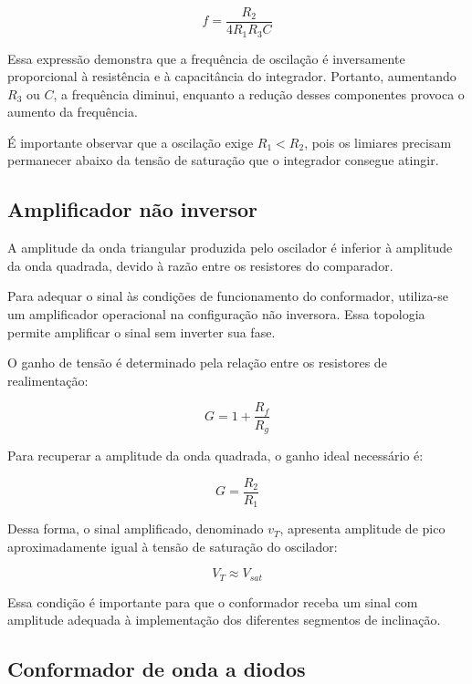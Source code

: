 \documentclass[11pt,a4paper]{article}
\begin{document}
\begin{equation}
f=\frac{R_2}{4R_1R_3C}
\label{eq:frequencia}
\end{equation}

Essa expressão demonstra que a frequência de oscilação é inversamente proporcional à resistência e à capacitância do integrador. Portanto, aumentando $R_3$ ou $C$, a frequência diminui, enquanto a redução desses componentes provoca o aumento da frequência.

É importante observar que a oscilação exige $R_1<R_2$, pois os limiares precisam permanecer abaixo da tensão de saturação que o integrador consegue atingir.

\subsection{Amplificador não inversor}

A amplitude da onda triangular produzida pelo oscilador é inferior à amplitude da onda quadrada, devido à razão entre os resistores do comparador.

Para adequar o sinal às condições de funcionamento do conformador, utiliza-se um amplificador operacional na configuração não inversora. Essa topologia permite amplificar o sinal sem inverter sua fase.

O ganho de tensão é determinado pela relação entre os resistores de realimentação:

\begin{equation}
G=1+\frac{R_f}{R_g}
\end{equation}

Para recuperar a amplitude da onda quadrada, o ganho ideal necessário é:

\begin{equation}
G=\frac{R_2}{R_1}
\label{eq:ganho}
\end{equation}

Dessa forma, o sinal amplificado, denominado $v_T$, apresenta amplitude de pico aproximadamente igual à tensão de saturação do oscilador:

\begin{equation}
V_T\approx V_{sat}
\end{equation}

Essa condição é importante para que o conformador receba um sinal com amplitude adequada à implementação dos diferentes segmentos de inclinação.

\subsection{Conformador de onda a diodos}
\end{document}
